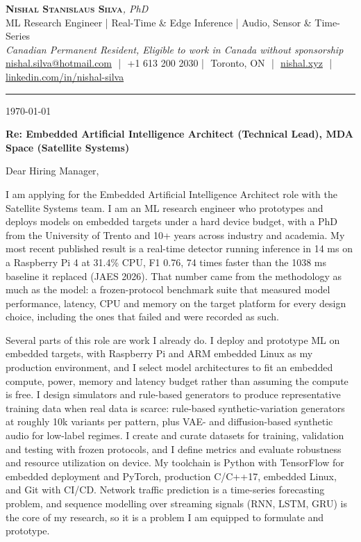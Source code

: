 \documentclass[11pt]{article}
\makeatletter
\newcommand{\clName}{Nishal Stanislaus Silva}
\newcommand{\clEmail}{nishal.silva@hotmail.com}
\newcommand{\clPhone}{+1 613 200 2030}
\newcommand{\clCity}{Toronto, ON}
\newcommand{\clSite}{https://nishal.xyz}
\newcommand{\clLinkedIn}{https://www.linkedin.com/in/nishal-silva}
\newcommand{\clStatus}{Canadian Permanent Resident, Eligible to work in Canada without sponsorship}
\newcommand{\clTagline}{ML Research Engineer | Real-Time \& Edge Inference | Audio, Sensor \& Time-Series}
\newcommand{\clRole}{Embedded Artificial Intelligence Architect (Technical Lead)}
\newcommand{\clCompany}{MDA Space}
\newcommand{\clAddressee}{Dear Hiring Manager,}
\makeatother
\begin{document}
\pagestyle{empty}
\begin{center}
    {\LARGE \scshape \textbf{\clName}}{\large \textit{, PhD}}\\[1pt]
    {\small \clTagline}\\[1pt]
    {\footnotesize\textit{\clStatus}}\\[1pt]
    {\small
    \href{mailto:\clEmail}{\clEmail} \,\,|\,\, \clPhone \,\,|\,\, \clCity
    \,\,|\,\, \href{\clSite}{nishal.xyz} \,\,|\,\, \href{\clLinkedIn}{linkedin.com/in/nishal-silva}}
\end{center}

\rule{\linewidth}{0.4pt}\vspace{0.6em}

\today

\textbf{Re: \clRole{}, \clCompany{} (Satellite Systems)}

\clAddressee

I am applying for the Embedded Artificial Intelligence Architect role with the Satellite Systems team. I am an ML research engineer who prototypes and deploys models on embedded targets under a hard device budget, with a PhD from the University of Trento and 10+ years across industry and academia. My most recent published result is a real-time detector running inference in 14 ms on a Raspberry Pi 4 at 31.4\% CPU, F1 0.76, 74 times faster than the 1038 ms baseline it replaced (JAES 2026). That number came from the methodology as much as the model: a frozen-protocol benchmark suite that measured model performance, latency, CPU and memory on the target platform for every design choice, including the ones that failed and were recorded as such.

Several parts of this role are work I already do. I deploy and prototype ML on embedded targets, with Raspberry Pi and ARM embedded Linux as my production environment, and I select model architectures to fit an embedded compute, power, memory and latency budget rather than assuming the compute is free. I design simulators and rule-based generators to produce representative training data when real data is scarce: rule-based synthetic-variation generators at roughly 10k variants per pattern, plus VAE- and diffusion-based synthetic audio for low-label regimes. I create and curate datasets for training, validation and testing with frozen protocols, and I define metrics and evaluate robustness and resource utilization on device. My toolchain is Python with TensorFlow for embedded deployment and PyTorch, production C/C++17, embedded Linux, and Git with CI/CD. Network traffic prediction is a time-series forecasting problem, and sequence modelling over streaming signals (RNN, LSTM, GRU) is the core of my research, so it is a problem I am equipped to formulate and prototype.
\end{document}
